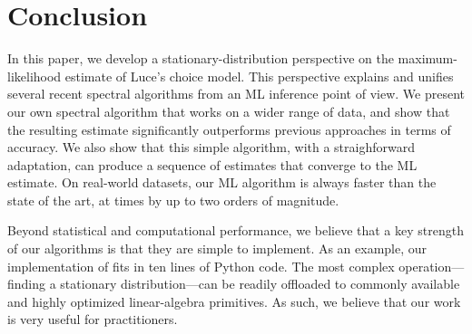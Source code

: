 \section{Conclusion}
\label{fi:sec:conclusion}

In this paper, we develop a stationary-distribution perspective on the maximum-likelihood estimate of Luce's choice model.
This perspective explains and unifies several recent spectral algorithms from an ML inference point of view.
We present our own spectral algorithm that works on a wider range of data, and show that the resulting estimate significantly outperforms previous approaches in terms of accuracy.
We also show that this simple algorithm, with a straighforward adaptation, can produce a sequence of estimates that converge to the ML estimate.
On real-world datasets, our ML algorithm is always faster than the state of the art, at times by up to two orders of magnitude.

Beyond statistical and computational performance, we believe that a key strength of our algorithms is that they are simple to implement.
As an example, our implementation of \LSR{} fits in ten lines of Python code.
The most complex operation---finding a stationary distribution---can be readily offloaded to commonly available and highly optimized linear-algebra primitives.
As such, we believe that our work is very useful for practitioners.
